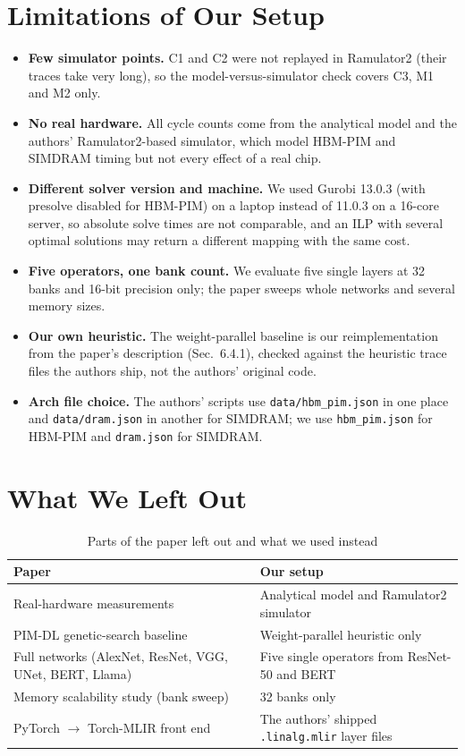 \section{Limitations of Our Setup}
\label{sec:limits}
\begin{itemize}
\item \textbf{Few simulator points.} C1 and C2 were not replayed in Ramulator2 (their traces take very long), so the model-versus-simulator check covers C3, M1 and M2 only.
\item \textbf{No real hardware.} All cycle counts come from the analytical
model and the authors' Ramulator2-based simulator, which model HBM-PIM and
SIMDRAM timing but not every effect of a real chip.
\item \textbf{Different solver version and machine.} We used Gurobi 13.0.3 (with presolve disabled for HBM-PIM) on
a laptop instead of 11.0.3 on a 16-core server, so absolute solve times are
not comparable, and an ILP with several optimal solutions may return a
different mapping with the same cost.
\item \textbf{Five operators, one bank count.} We evaluate five single layers
at 32 banks and 16-bit precision only; the paper sweeps whole networks and
several memory sizes.
\item \textbf{Our own heuristic.} The weight-parallel baseline is our
reimplementation from the paper's description (Sec.~6.4.1), checked against
the heuristic trace files the authors ship, not the authors' original code.
\item \textbf{Arch file choice.} The authors' scripts use
\texttt{data/hbm\_pim.json} in one place and \texttt{data/dram.json} in
another for SIMDRAM; we use \texttt{hbm\_pim.json} for HBM-PIM and \texttt{dram.json} for SIMDRAM.
\end{itemize}

\section*{What We Left Out}
\begin{table}[h]
\centering
\caption{Parts of the paper left out and what we used instead}
\label{tab:leftout}
\begin{tabular}{p{}p{}}
\hline
Paper & Our setup \\
\hline
Real-hardware measurements & Analytical model and Ramulator2 simulator \\
PIM-DL genetic-search baseline & Weight-parallel heuristic only \\
Full networks (AlexNet, ResNet, VGG, UNet, BERT, Llama) & Five single operators from ResNet-50 and BERT \\
Memory scalability study (bank sweep) & 32 banks only \\
PyTorch $\to$ Torch-MLIR front end & The authors' shipped \texttt{.linalg.mlir} layer files \\
\hline
\end{tabular}
\end{table}

